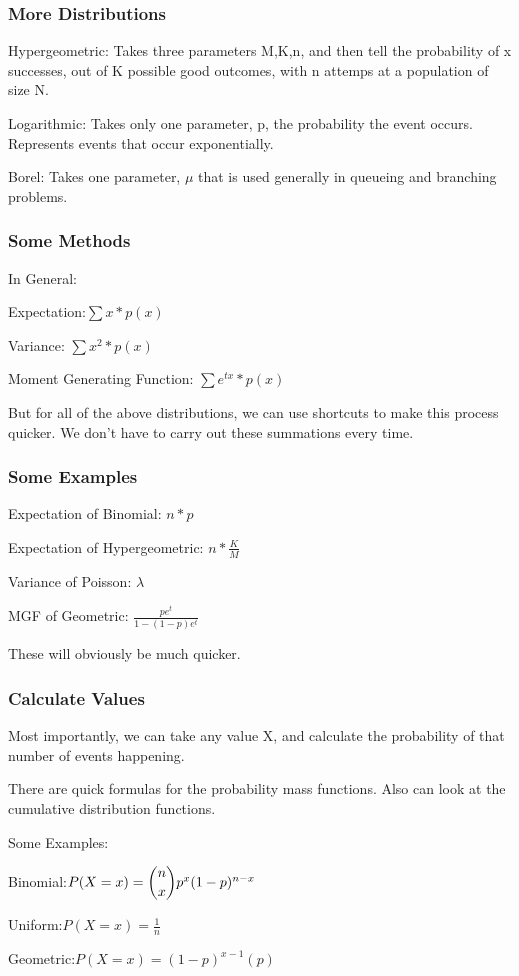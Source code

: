 \documentclass{beamer}
\begin{document}
\begin{frame}
\frametitle{More Distributions}
Hypergeometric: Takes three parameters M,K,n, and then tell the probability of x successes, out of K possible good outcomes, with n attemps at a population of size N.

Logarithmic: Takes only one parameter, p, the probability the event occurs. Represents events that occur exponentially.

Borel:  Takes one parameter, $\mu$ that is used generally in queueing and branching problems.

\end{frame}

\begin{frame}
\frametitle{Some Methods}
In General:

Expectation:$ \sum x * p(x) $

Variance: $ \sum x^2 * p(x)$

Moment Generating Function: $ \sum e^{tx} * p(x) $

But for all of the above distributions, we can use shortcuts to make this process quicker. We don't have to carry out these summations every time.
\end{frame}

\begin{frame}
\frametitle{Some Examples}
Expectation of Binomial: $n*p$

Expectation of Hypergeometric: $n * \frac{K}{M}$

Variance of Poisson: $ \lambda $

MGF of Geometric: $ \frac{pe^t}{1-(1-p)e^t} $

These will obviously be much quicker.
\end{frame}

\begin{frame}
\frametitle{Calculate Values}
Most importantly, we can take any value X, and calculate the probability of that number of events happening.

There are quick formulas for the probability mass functions. Also can look at the cumulative distribution functions.

Some Examples:

Binomial:$ P(X=x) = \dbinom{n}{x}p^x(1-p)^{n-x}$

Uniform:$ P(X=x) = \frac{1}{n} $

Geometric:$ P(X=x) = (1-p)^{x-1}(p) $



\end{frame}
\end{document}
